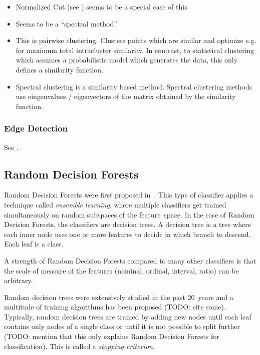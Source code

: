 \begin{itemize}
    \item Normalized Cut (see \cite{shi2000normalized}) seems to be a special
          case of this
    \item Seems to be a \enquote{spectral method}
    \item This is pairwise clustering. Clusters points which are similar and
          optimize e.g. for maximum total intracluster similarity. In contrast,
          to statistical clustering which assumes a probabilistic model which
          generates the data, this only defines a similarity function.
    \item Spectral clustering is a similarity based method. Spectral clustering
          methods use eingenvalues / eigenvectors of the matrix obtained by the
          similarity function.
\end{itemize}

\subsubsection{Edge Detection}

See \cite{kass1988snakes}.


\subsection{Random Decision Forests}\label{subsec:random-forests}
Random Decision Forests were first proposed in~\cite{ho1995random}. This type
of classifier applies a technique called \textit{ensemble learning}, where
multiple classifiers get trained simultaneously on random subspaces of the
feature~space. In the case of Random Decision Forests, the classifiers are
decision trees. A decision tree is a tree where each inner node uses one or
more features to decide in which branch to descend. Each leaf is a class.

A strength of Random Decision Forests compared to many other classifiers is
that the scale of measure of the features (nominal, ordinal, interval, ratio)
can be arbitrary.

Random decision trees were extensively studied in the past 20~years and a
multitude of training algorithms has been proposed (TODO: cite some).
Typically, random decision trees are trained by adding new nodes until each
leaf contains only nodes of a single class or until it is not possible to split
further (TODO: mention that this only
explains Random Decision Forests for classification). This is called a
\textit{stopping criterion}.

